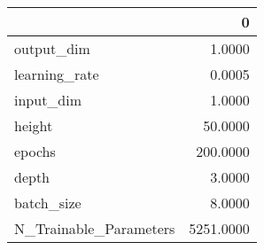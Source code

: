 \begin{tabular}{lr}
\toprule
{} &          0 \\
\midrule
output\_dim             &     1.0000 \\
learning\_rate          &     0.0005 \\
input\_dim              &     1.0000 \\
height                 &    50.0000 \\
epochs                 &   200.0000 \\
depth                  &     3.0000 \\
batch\_size             &     8.0000 \\
N\_Trainable\_Parameters &  5251.0000 \\
\bottomrule
\end{tabular}
